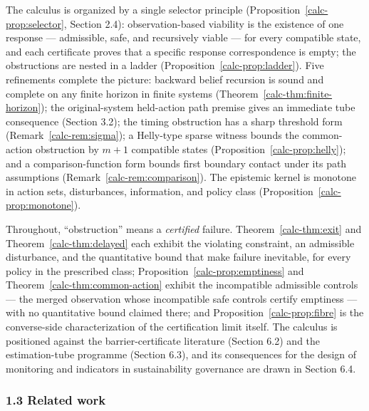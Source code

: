 \documentclass[10pt,twocolumn]{article}
\theoremstyle{definition}
\begin{document}
The calculus is organized by a single selector principle (Proposition~\ref{calc-prop:selector}, Section 2.4):
observation-based viability is the existence of one response ---
admissible, safe, and recursively viable --- for every compatible state,
and each certificate proves that a specific response correspondence is
empty; the obstructions are nested in a ladder
(Proposition~\ref{calc-prop:ladder}). Five refinements complete the picture:
backward belief recursion is sound and complete on any finite horizon
in finite systems (Theorem~\ref{calc-thm:finite-horizon}); the original-system held-action path premise gives an immediate tube consequence (Section 3.2); the timing obstruction has a
sharp threshold form (Remark~\ref{calc-rem:sigma}); a Helly-type sparse
witness bounds the common-action obstruction by \(m+1\) compatible
states (Proposition~\ref{calc-prop:helly}); and a comparison-function form bounds first boundary contact under its path assumptions (Remark~\ref{calc-rem:comparison}). The epistemic kernel is monotone in
action sets, disturbances, information, and policy class
(Proposition~\ref{calc-prop:monotone}).

Throughout, ``obstruction'' means a \emph{certified} failure. Theorem~\ref{calc-thm:exit} and Theorem~\ref{calc-thm:delayed} each exhibit the violating constraint, an admissible disturbance,
and the quantitative bound that make failure inevitable, for every policy in the prescribed class; Proposition~\ref{calc-prop:emptiness} and Theorem~\ref{calc-thm:common-action} exhibit the incompatible
admissible controls --- the merged observation whose incompatible safe
controls certify emptiness --- with no quantitative bound claimed there;
and Proposition~\ref{calc-prop:fibre} is the converse-side characterization of the certification
limit itself. The calculus is positioned against
the barrier-certificate literature (Section 6.2) and the estimation-tube
programme (Section 6.3), and its consequences for the design of
monitoring and indicators in sustainability governance are drawn in
Section 6.4.

\subsubsection{1.3 Related work}\label{calc-related-work}
\end{document}
